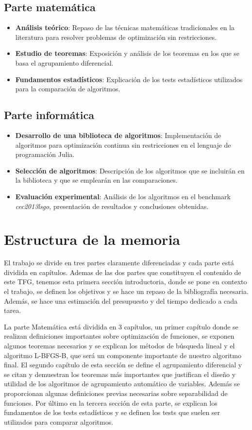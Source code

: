\subsection*{Parte matemática}
\begin{itemize}
    \item \textbf{Análisis teórico}: Repaso de las técnicas matemáticas tradicionales en la literatura para resolver problemas de optimización sin restricciones.
    \item \textbf{Estudio de teoremas}: Exposición y análisis de los teoremas en los que se basa el agrupamiento diferencial.
    \item \textbf{Fundamentos estadísticos}: Explicación de los tests estadísticos utilizados para la comparación de algoritmos.
\end{itemize}

\subsection*{Parte informática}
\begin{itemize}
    \item \textbf{Desarrollo de una biblioteca de algoritmos}: Implementación de algoritmos para optimización continua sin restricciones en el lenguaje de programación Julia.
    \item \textbf{Selección de algoritmos}: Descripción de los algoritmos que se incluirán en la biblioteca y que se emplearán en las comparaciones.
    \item \textbf{Evaluación experimental}: Análisis de los algoritmos en el benchmark \textit{cec2013lsgo}, presentación de resultados y conclusiones obtenidas.
\end{itemize}

\section*{Estructura de la memoria}

El trabajo se divide en tres partes claramente diferenciadas y cada parte está dividida en capítulos. Ademas de las dos partes que constituyen el contenido de este TFG, tenemos esta primera sección introductoria, donde se pone en contexto el trabajo, se definen los objetivos y se hace un repaso de la bibliografía necesaria. 
Además, se hace una estimación del presupuesto y del tiempo dedicado a cada tarea.

La parte Matemática está dividida en 3 capítulos, un primer capítulo donde se realizan definiciones importantes sobre optimización de funciones, se exponen algunos teoremas necesarios y se explican los métodos de búsqueda lineal y el algoritmo L-BFGS-B, que será un componente importante de nuestro algoritmo final. El segundo capítulo de esta sección se define el agrupamiento diferencial y se citan y demuestran los teoremas más importantes que justifican el diseño y utilidad de los algoritmos de agrupamiento automático de variables. Además se proporcionan algunas definiciones previas necesarias sobre separabilidad de funciones. Por último en la tercera sección de esta parte, se explican los fundamentos de los tests estadísticos y se definen los tests que suelen ser utilizados para comparar algoritmos. 

